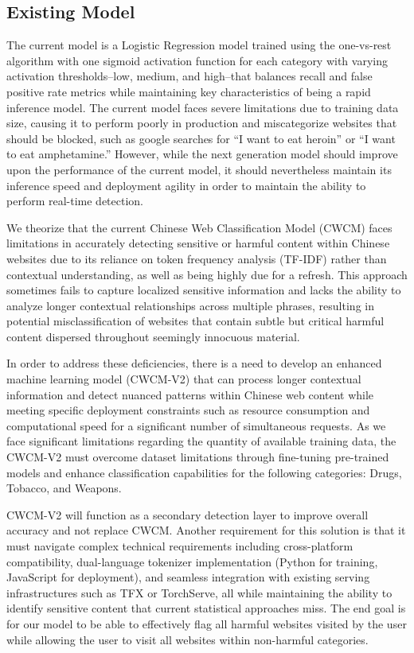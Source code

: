\documentclass[
  titlepage]{article}
\begin{document}
\subsection{Existing Model}\label{existing-model}

The current model is a Logistic Regression model trained using the
one-vs-rest algorithm with one sigmoid activation function for each
category with varying activation thresholds--low, medium, and high--that
balances recall and false positive rate metrics while maintaining key
characteristics of being a rapid inference model. The current model
faces severe limitations due to training data size, causing it to
perform poorly in production and miscategorize websites that should be
blocked, such as google searches for ``I want to eat heroin'' or ``I
want to eat amphetamine.'' However, while the next generation model
should improve upon the performance of the current model, it should
nevertheless maintain its inference speed and deployment agility in
order to maintain the ability to perform real-time detection.

We theorize that the current Chinese Web Classification Model (CWCM)
faces limitations in accurately detecting sensitive or harmful content
within Chinese websites due to its reliance on token frequency analysis
(TF-IDF) rather than contextual understanding, as well as being highly
due for a refresh. This approach sometimes fails to capture localized
sensitive information and lacks the ability to analyze longer contextual
relationships across multiple phrases, resulting in potential
misclassification of websites that contain subtle but critical harmful
content dispersed throughout seemingly innocuous material.

In order to address these deficiencies, there is a need to develop an
enhanced machine learning model (CWCM-V2) that can process longer
contextual information and detect nuanced patterns within Chinese web
content while meeting specific deployment constraints such as resource
consumption and computational speed for a significant number of
simultaneous requests. As we face significant limitations regarding the
quantity of available training data, the CWCM-V2 must overcome dataset
limitations through fine-tuning pre-trained models and enhance
classification capabilities for the following categories: Drugs,
Tobacco, and Weapons.

CWCM-V2 will function as a secondary detection layer to improve overall
accuracy and not replace CWCM. Another requirement for this solution is
that it must navigate complex technical requirements including
cross-platform compatibility, dual-language tokenizer implementation
(Python for training, JavaScript for deployment), and seamless
integration with existing serving infrastructures such as TFX or
TorchServe, all while maintaining the ability to identify sensitive
content that current statistical approaches miss. The end goal is for
our model to be able to effectively flag all harmful websites visited by
the user while allowing the user to visit all websites within
non-harmful categories.
\end{document}
